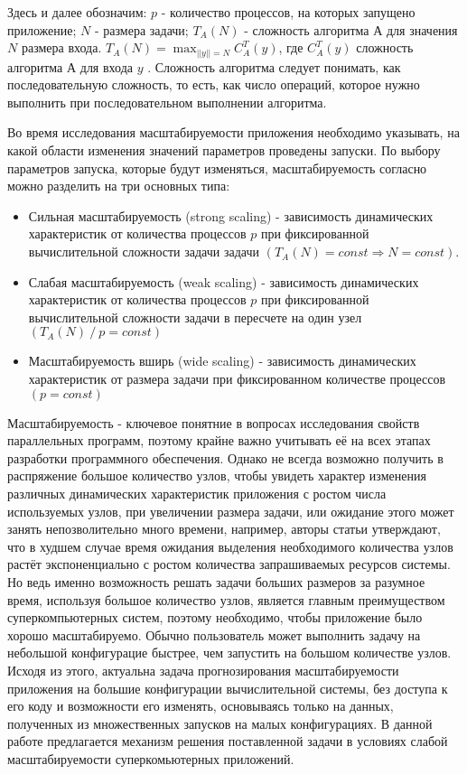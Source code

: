 	Здесь и далее обозначим: \(p\) - количество процессов, на которых запущено приложение; \(N\) - размера задачи; \(T_A(N)\) - сложность алгоритма \(А\) для значения \(N\) размера входа. \(T_A(N) = \max_{||y|| = N} C^T_A(y)\), где \(C^T_A(y)\) сложность алгоритма \(А\) для входа \(y\) \cite{COMPLEXITY}. Сложность алгоритма следует понимать, как последовательную сложность, то есть, как число операций, которое нужно выполнить при последовательном выполнении алгоритма.

	Во время исследования масштабируемости приложения необходимо указывать, на какой области изменения значений параметров проведены запуски. По выбору параметров запуска, которые будут изменяться, масштабируемость согласно \cite{scaling_types} можно разделить на три основных типа:
	\begin{itemize}
		\item Сильная масштабируемость (strong scaling) - зависимость динамических характеристик от количества процессов \(p\) при фиксированной вычислительной сложности задачи задачи \((T_A(N) = const \Rightarrow N = const)\).
		\item Слабая масштабируемость (weak scaling) - зависимость динамических характеристик от количества процессов \(p\) при фиксированной вычислительной сложности задачи в пересчете на один узел \((T_A(N)\:/\:p = const)\)
		\item Масштабируемость вширь (wide scaling) - зависимость динамических характеристик от размера задачи при фиксированном количестве процессов \((p = const)\)
	\end{itemize}

	Масштабируемость - ключевое понятние в вопросах исследования свойств параллельных программ, поэтому крайне важно учитывать её на всех этапах разработки программного обеспечения. Однако не всегда возможно получить в распряжение большое количество узлов, чтобы увидеть характер изменения различных динамических характеристик приложения с ростом числа используемых узлов, при увеличении размера задачи, или ожидание этого может занять непозволительно много времени, например, авторы статьи \cite{log_main} утверждают, что в худшем случае время ожидания выделения необходимого количества узлов растёт экспоненциально с ростом количества запрашиваемых ресурсов системы. Но ведь именно возможность решать задачи больших размеров за разумное время, используя большое количество узлов, является главным преимуществом суперкомпьютерных систем, поэтому необходимо, чтобы приложение было хорошо масштабируемо. Обычно пользователь может выполнить задачу на небольшой конфигурацие быстрее, чем запустить на большом количестве узлов. Исходя из этого, актуальна задача прогнозирования масштабируемости приложения на большие конфигурации вычислительной системы, без доступа к его коду и возможности его изменять, основываясь только на данных, полученных из множественных запусков на малых конфигурациях. В данной работе предлагается механизм решения поставленной задачи в условиях слабой масштабируемости суперкомьютерных приложений.

